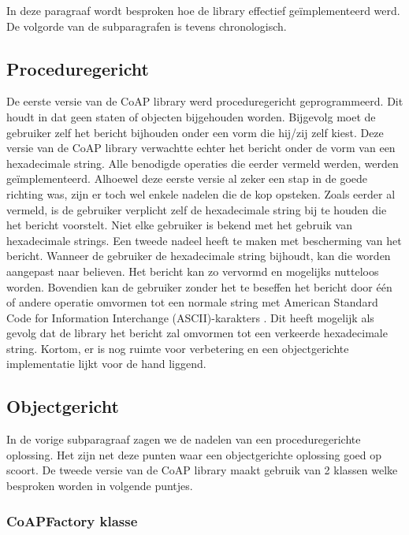 In deze paragraaf wordt besproken hoe de library effectief ge\"{i}mplementeerd werd. De volgorde van de subparagrafen is tevens chronologisch. 

\subsection{Proceduregericht}

De eerste versie van de CoAP library werd proceduregericht geprogrammeerd. Dit houdt in dat geen staten of objecten bijgehouden worden. Bijgevolg moet de gebruiker zelf het bericht bijhouden onder een vorm die hij/zij zelf kiest. Deze versie van de CoAP library verwachtte echter het bericht onder de vorm van een hexadecimale string. Alle benodigde operaties die eerder vermeld werden, werden ge\"{i}mplementeerd. Alhoewel deze eerste versie al zeker een stap in de goede richting was, zijn er toch wel enkele nadelen die de kop opsteken. Zoals eerder al vermeld, is de gebruiker verplicht zelf de hexadecimale string bij te houden die het bericht voorstelt. Niet elke gebruiker is bekend met het gebruik van hexadecimale strings. Een tweede nadeel heeft te maken met bescherming van het bericht. Wanneer de gebruiker de hexadecimale string bijhoudt, kan die worden aangepast naar believen. Het bericht kan zo vervormd en mogelijks nutteloos worden. Bovendien kan de gebruiker zonder het te beseffen het bericht door \'{e}\'{e}n of andere operatie omvormen tot een normale string met American Standard Code for Information Interchange (ASCII)-karakters . Dit heeft mogelijk als gevolg dat de library het bericht zal omvormen tot een verkeerde hexadecimale string. Kortom, er is nog ruimte voor verbetering en een objectgerichte implementatie lijkt voor de hand liggend.

\subsection{Objectgericht}

In de vorige subparagraaf zagen we de nadelen van een proceduregerichte oplossing. Het zijn net deze punten waar een objectgerichte oplossing goed op scoort. De tweede versie van de CoAP library maakt gebruik van 2 klassen welke besproken worden in volgende puntjes.

\subsubsection{CoAPFactory klasse}

